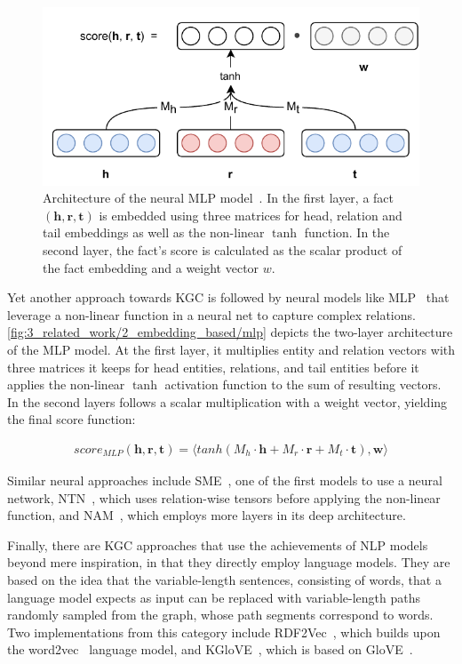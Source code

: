 \begin{figure}[t]
    \centering
    \includegraphics{3_related_work/2_embedding_based/mlp}
    \caption{Architecture of the neural MLP model~\cite{Dong2014KnowledgeVA}. In the first layer, a fact $(\textbf{h}, \textbf{r}, \textbf{t})$ is embedded using three matrices for head, relation and tail embeddings as well as the non-linear $\tanh$ function. In the second layer, the fact's score is calculated as the scalar product of the fact embedding and a weight vector $w$.}
    \label{fig:3_related_work/2_embedding_based/mlp}
\end{figure}

Yet another approach towards KGC is followed by neural models like MLP~\cite{Dong2014KnowledgeVA} that leverage a non-linear function in a neural net to capture complex relations. \autoref{fig:3_related_work/2_embedding_based/mlp} depicts the two-layer architecture of the MLP model. At the first layer, it multiplies entity and relation vectors with three matrices it keeps for head entities, relations, and tail entities before it applies the non-linear $\tanh$ activation function to the sum of resulting vectors. In the second layers follows a scalar multiplication with a weight vector, yielding the final score function:

\begin{align}
    score_{MLP}(\textbf{h}, \textbf{r}, \textbf{t}) = \langle tanh(M_h \cdot \textbf{h} + M_r \cdot \textbf{r} + M_t \cdot \textbf{t}), \textbf{w} \rangle
    \label{eq:3_related_work/2_embedding_based/mlp}
\end{align}

Similar neural approaches include SME~\cite{Glorot2013ASM}, one of the first models to use a neural network, NTN~\cite{Socher2013ReasoningWN}, which uses relation-wise tensors before applying the non-linear function, and NAM~\cite{LIU2016ProbabilisticRV}, which employs more layers in its deep architecture.

Finally, there are KGC approaches that use the achievements of NLP models beyond mere inspiration, in that they directly employ language models. They are based on the idea that the variable-length sentences, consisting of words, that a language model expects as input can be replaced with variable-length paths randomly sampled from the graph, whose path segments correspond to words. Two implementations from this category include RDF2Vec~\cite{Ristoski2016RDF2VecRG}, which builds upon the word2vec~\cite{Mikolov2013EfficientEO} language model, and KGloVE~\cite{Cochez2017GlobalRV}, which is based on GloVE~\cite{Pennington2014GloveGV}.
